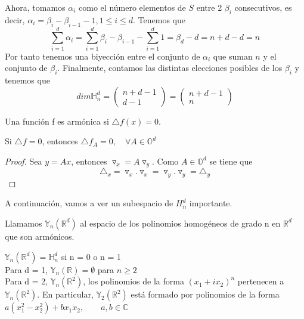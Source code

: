 Ahora, tomamos $\alpha_i$ como el número elementos de $S$ entre 2 $\beta_i$ consecutivos, es decir, $ \alpha_i =  \beta_i - \beta_{i-1} - 1,  1\leq i \leq d$. Tenemos que $$
\sum_{i=1}^{d} \alpha_i = \sum_{i=1}^{d} \beta_i - \beta_{i-1} - \sum_{i=1}^{d} 1 = \beta_d - d = n+d-d = n
$$
Por tanto tenemos una biyección entre el conjunto de $\alpha_i$ que suman $n$ y el conjunto de $\beta_i$. Finalmente, contamos las distintas elecciones posibles de los $\beta_i$ y tenemos que
$$
dim \mathds{H}^d_n = \begin{pmatrix}
n+d-1 \\
d-1
\end{pmatrix} = \begin{pmatrix}
n+d-1 \\
n
\end{pmatrix}
$$
\begin{defn}
Una función f es armónica si $\triangle f (x) = 0$. 
\end{defn}
\begin{lem}
	Si $\triangle f = 0$, entonces $\triangle f_A = 0, \quad \forall A \in \mathds{O}^d$
\end{lem}
\begin{proof}
	Sea $ y = Ax$, entonces $\triangledown_x = A \triangledown_y$. Como $ A \in \mathds{O}^d$ se tiene que 
	$$
	\triangle_x = \triangledown_x . \triangledown_x = \triangledown_y . \triangledown_y = \triangle_y
	$$ 
\end{proof}
A continuación, vamos a ver un subespacio de $H^d_n$ importante.
\begin{defn}
Llamamos $\mathds{Y}_n(\mathds{R}^d)$ al espacio de los polinomios homogéneos de grado n en $\mathds{R}^d$ que son armónicos.
\end{defn}
\begin{example}
$\mathds{Y}_n(\mathds{R}^d) = \mathds{H}^d_n$ si n = 0 o n = 1\\
Para d = 1, $\mathds{Y}_n(\mathds{R})=\emptyset$ para $n\ge 2$\\
Para d = 2, $\mathds{Y}_n(\mathds{R}^2)$, los polinomios de la forma $(x_1 + ix_2) ^n$ pertenecen a $\mathds{Y}_n(\mathds{R}^2).$ En particular,  $\mathds{Y}_2(\mathds{R}^2)$ está formado por polinomios de la forma $a(x_1^2-x_2^2)+bx_1x_2, \qquad	a,b\in\mathds{C}$
\end{example} 
